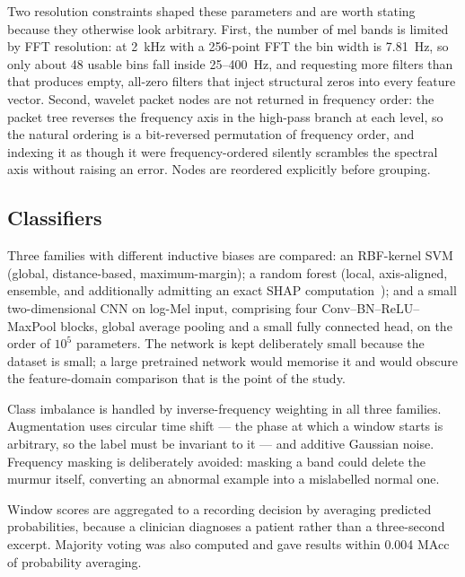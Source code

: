 Two resolution constraints shaped these parameters and are worth stating because
they otherwise look arbitrary. First, the number of mel bands is limited by FFT
resolution: at \SI{2}{\kilo\hertz} with a 256-point FFT the bin width is
\SI{7.81}{\hertz}, so only about 48 usable bins fall inside 25--\SI{400}{\hertz},
and requesting more filters than that produces empty, all-zero filters that
inject structural zeros into every feature vector. Second, wavelet packet nodes
are not returned in frequency order: the packet tree reverses the frequency axis
in the high-pass branch at each level, so the natural ordering is a bit-reversed
permutation of frequency order, and indexing it as though it were
frequency-ordered silently scrambles the spectral axis without raising an error.
Nodes are reordered explicitly before grouping.

\subsection{Classifiers}

Three families with different inductive biases are compared: an RBF-kernel SVM
(global, distance-based, maximum-margin); a random forest (local, axis-aligned,
ensemble, and additionally admitting an exact SHAP
computation~\cite{lundberg2020local}); and a small two-dimensional CNN on
log-Mel input, comprising four Conv--BN--ReLU--MaxPool blocks, global average
pooling and a small fully connected head, on the order of $10^5$ parameters. The
network is kept deliberately small because the dataset is small; a large
pretrained network would memorise it and would obscure the feature-domain
comparison that is the point of the study.

Class imbalance is handled by inverse-frequency weighting in all three families.
Augmentation uses circular time shift --- the phase at which a window starts is
arbitrary, so the label must be invariant to it --- and additive Gaussian noise.
Frequency masking is deliberately avoided: masking a band could delete the
murmur itself, converting an abnormal example into a mislabelled normal one.

Window scores are aggregated to a recording decision by averaging predicted
probabilities, because a clinician diagnoses a patient rather than a
three-second excerpt. Majority voting was also computed and gave results within
\num{0.004} MAcc of probability averaging.

% 
% 

